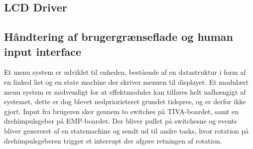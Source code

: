 \subsection{LCD Driver}


\subsection{Håndtering af brugergrænseflade og human input interface}

Et menu system er udviklet til enheden, bestående af en datastruktur i form af en linked list og en state machine der skriver menuen til displayet.
Et modulært menu system er nødvendigt for at effektmoduler kan tilføres helt uafhængigt af systemet, dette er dog blevet nedpriorieteret grundet tidspres, og er derfor ikke gjort.
Input fra brugeren sker gennem to switches på TIVA-boardet, samt en drehimpulsgeber på EMP-boardet.
Der bliver pullet på switchesne og events bliver genereret af en statemachine og sendt ud til andre tasks, hvor rotation på drehimpulsgeberen trigger et interrupt der afgøre retningen af rotation.